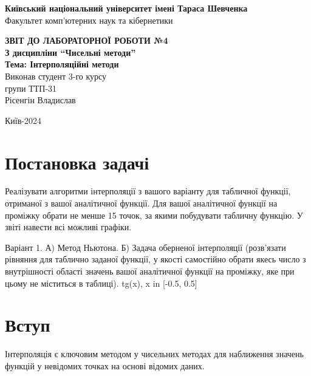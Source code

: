 \documentclass[a4paper, 12pt]{article}
\begin{document}
\begin{titlepage}
	\begin{center}
		\Large
		\textbf{Київський національний університет імені Тараса Шевченка} \\
		Факультет комп'ютерних наук та кібернетики \\

		\vspace{6cm}

		\textbf{\LARGE ЗВІТ ДО ЛАБОРАТОРНОЇ РОБОТИ №4} \\[0.5cm]
		\textbf{З дисципліни ``Чисельні методи''} \\[0.5cm]
		\textbf{Тема: Інтерполяційні методи} \\

		\vfill
		\hspace{7cm} Виконав студент 3-го курсу \\
		\hspace{7cm} групи ТТП-31 \\
		\hspace{7cm} Рісенгін Владислав \\
		\vspace{2cm}

		Київ-2024
	\end{center}
\end{titlepage}

\newpage


\section{Постановка задачі}

Реалізувати алгоритми інтерполяції з вашого варіанту для табличної функції, отриманої з вашої аналітичної функції. Для вашої аналітичної функції на проміжку обрати не менше 15 точок, за якими побудувати табличну функцію. У звіті навести всі можливі графіки. 

Варіант 1. 
А) Метод Ньютона.
Б) Задача оберненої інтерполяції (розв’язати рівняння  для таблично заданої функції, у якості  самостійно обрати якесь число з внутрішності області значень вашої аналітичної функції на проміжку, яке при цьому не міститься в таблиці).
tg(x), x in [-0.5, 0.5]

\section{Вступ}
Інтерполяція є ключовим методом у чисельних методах для наближення значень функцій у невідомих точках на основі відомих даних.
\end{document}
